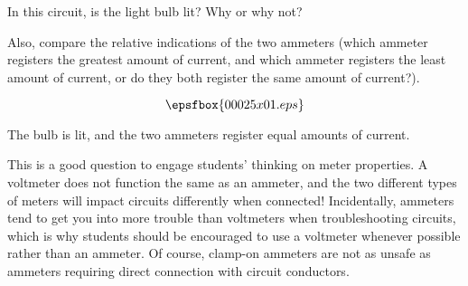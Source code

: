

In this circuit, is the light bulb lit?  Why or why not?

Also, compare the relative indications of the two ammeters (which ammeter registers the greatest amount of current, and which ammeter registers the least amount of current, or do they both register the same amount of current?).

$$\epsfbox{00025x01.eps}$$







The bulb is lit, and the two ammeters register equal amounts of current.







This is a good question to engage students' thinking on meter properties.  A voltmeter does not function the same as an ammeter, and the two different types of meters will impact circuits differently when connected!  Incidentally, ammeters tend to get you into more trouble than voltmeters when troubleshooting circuits, which is why students should be encouraged to use a voltmeter whenever possible rather than an ammeter.  Of course, clamp-on ammeters are not as unsafe as ammeters requiring direct connection with circuit conductors.




